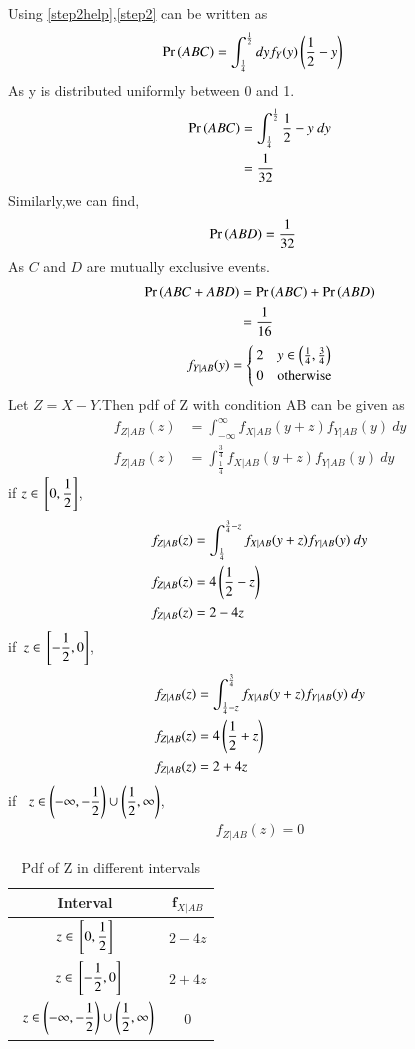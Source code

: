 \documentclass[journal,12pt,twocolumn]{IEEEtran}
\begin{document}
     Using \eqref{step2help},\eqref{step2} can be written as
     \begin{align}
    \Pr\left(ABC\right)&=\int_{\frac{1}{4}}^{\frac{1}{2}}dyf_Y(y)\left(\frac{1}{2}-y\right)
    \end{align}
    As y is distributed uniformly between 0 and 1.
    \begin{align}
   \Pr\left(ABC\right) &=\int_{\frac{1}{4}}^{\frac{1}{2}}\frac{1}{2}-y~dy\\
    &=\dfrac{1}{32}
\end{align}
Similarly,we can find,
\begin{align}
    \Pr\left(ABD\right)&=\dfrac{1}{32}
\end{align}
As $C$ and $D$ are mutually exclusive events.
\begin{align}
    \Pr\left(ABC+ABD\right)&=\Pr\left(ABC\right)+\Pr\left(ABD\right)\\
    &=\dfrac{1}{16} 
\end{align}
\begin{align}
    f_{Y|AB}(y) = 
    \begin{cases}
    2 & y\in \left(\frac{1}{4},\frac{3}{4}\right)\\
    0 & \text{otherwise}
    \end{cases}
\end{align}
Let $Z=X-Y$.Then pdf of Z with condition AB can be given as
\begin{align}
    f_{Z|AB}(z)&=\int_{-\infty}^{\infty}f_{X|AB}(y+z)f_{Y|AB}(y)~dy\\
    f_{Z|AB}(z)&=\int_{\frac{1}{4}}^{\frac{3}{4}}f_{X|AB}(y+z)f_{Y|AB}(y)~dy
\end{align}
if $z \in {}\left[0,\dfrac{1}{2}\right]$,
\begin{align}
    f_{Z|AB}(z)&=\int_{\frac{1}{4}}^{\frac{3}{4}-z}f_{X|AB}(y+z)f_{Y|AB}(y)~dy\\
       f_{Z|AB}(z)&=4\left(\frac{1}{2}-z\right)\\
       f_{Z|AB}(z)&=2-4z
\end{align}
if$~~z \in {}\left[-\dfrac{1}{2},0\right]$,
\begin{align}
    f_{Z|AB}(z)&=\int_{\frac{1}{4}-z}^{\frac{3}{4}}f_{X|AB}(y+z)f_{Y|AB}(y)~dy\\
       f_{Z|AB}(z)&=4\left(\frac{1}{2}+z\right)\\
       f_{Z|AB}(z)&=2+4z 
\end{align}
if $~~z \in \left(-\infty,-\dfrac{1}{2}\right)\cup \left(\dfrac{1}{2},\infty\right)$,
\begin{align}
    f_{Z|AB}(z)=0
\end{align}
\begin{table}[h]
\centering
\bgroup
\def\arraystretch{2}
\begin{tabular}{|c|c|}
\hline
\textbf{Interval} & ${\boldsymbol f_{X|AB}}$                     \\\hline
$z \in {}\left[0,\dfrac{1}{2}\right]$       & $2-4z$ \\[1ex] \hline
$~~z \in {}\left[-\dfrac{1}{2},0\right]$          & $2+4z$ \\[1ex] \hline
   $~~z \in \left(-\infty,-\dfrac{1}{2}\right)\cup \left(\dfrac{1}{2},\infty\right)$        & $0$ \\[1ex] \hline
\end{tabular}
\egroup
\caption{Pdf of Z in different intervals}
\label{tab:pdf_Z}
\end{table}
\end{document}
